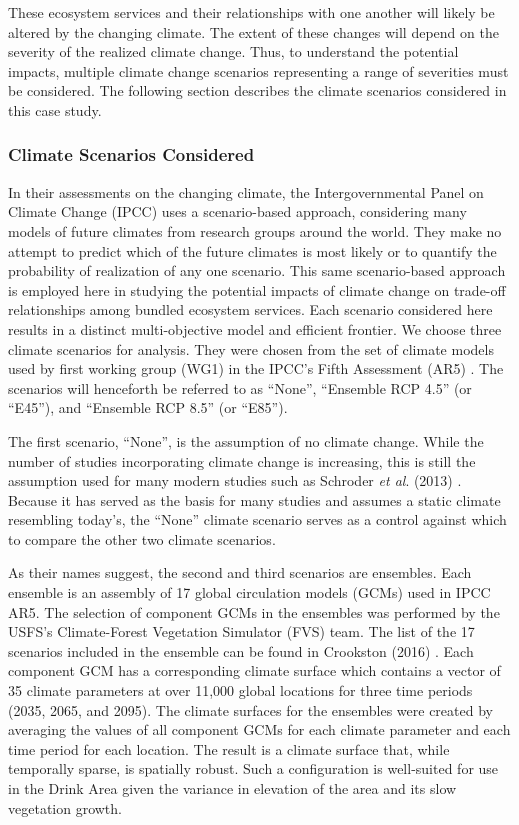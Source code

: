 These ecosystem services and their relationships with one another will likely be altered by the changing climate. The extent of these changes will depend on the severity of the realized climate change. Thus, to understand the potential impacts, multiple climate change scenarios representing a range of severities must be considered. The following section describes the climate scenarios considered in this case study.

\subsubsection{Climate Scenarios Considered}
\label{sec:climateScenarios}
In their assessments on the changing climate, the Intergovernmental Panel on Climate Change (IPCC) uses a scenario-based approach, considering many models of future climates from research groups around the world. They make no attempt to predict which of the future climates is most likely or to quantify the probability of realization of any one scenario. This same scenario-based approach is employed here in studying the potential impacts of climate change on trade-off relationships among bundled ecosystem services. Each scenario considered here results in a distinct multi-objective model and efficient frontier. We choose three climate scenarios for analysis. They were chosen from the set of climate models used by first working group (WG1) in the IPCC's Fifth Assessment (AR5) \cite{ipcc2013climate}. The scenarios will henceforth be referred to as ``None'', ``Ensemble RCP 4.5'' (or ``E45''), and ``Ensemble RCP 8.5'' (or ``E85'').

The first scenario, ``None'', is the assumption of no climate change. While the number of studies incorporating climate change is increasing, this is still the assumption used for many modern studies such as Schroder \textit{et al}. (2013) \cite{schroder2016multi}. Because it has served as the basis for many studies and assumes a static climate resembling today's, the ``None'' climate scenario serves as a control against which to compare the other two climate scenarios.

As their names suggest, the second and third scenarios are ensembles. Each ensemble is an assembly of 17 global circulation models (GCMs) used in IPCC AR5. The selection of component GCMs in the ensembles was performed by the USFS's Climate-Forest Vegetation Simulator (FVS) \cite{dixon2002essential} team. The list of the 17 scenarios included in the ensemble can be found in Crookston (2016) \cite{ClimateModelsInFVSEnsemble}. Each component GCM has a corresponding climate surface which contains a vector of 35 climate parameters at over 11,000 global locations for three time periods (2035, 2065, and 2095). The climate surfaces for the ensembles were created by averaging the values of all component GCMs for each climate parameter and each time period for each location. The result is a climate surface that, while temporally sparse, is spatially robust. Such a configuration is well-suited for use in the Drink Area given the variance in elevation of the area and its slow vegetation growth.

